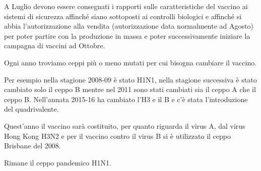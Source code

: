 A Luglio devono essere consegnati i rapporti sulle caratteristiche del
vaccino ai sistemi di sicurezza affinché siano sottoposti ai controlli
biologici e affinché si abbia l'autorizzazione alla vendita
(autorizzazione data normalmente ad Agosto) per poter partire con la
produzione in massa e poter successivamente iniziare la campagna di
vaccini ad Ottobre.

Ogni anno troviamo ceppi più o meno mutati per cui bisogna cambiare il
vaccino.

Per esempio nella stagione 2008-09 è stato H1N1, nella stagione
successiva è stato cambiato solo il ceppo B mentre nel 2011 sono stati
cambiati sia il ceppo A che il ceppo B. Nell'annata 2015-16 ha cambiato
l'H3 e il B e c'è stata l'introduzione del quadrivalente.

Quest'anno il vaccino sarà costituito, per quanto riguarda il virus A,
dal virus Hong Kong H3N2 e per il vaccino contro il virus B si è
utilizzato il ceppo Brisbane del 2008.

Rimane il ceppo pandemico H1N1.

